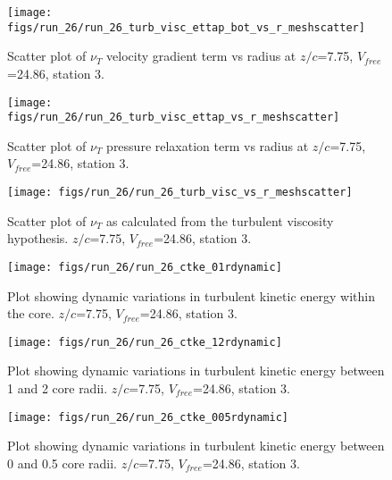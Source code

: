 \begin{figure}[H]
\centering
\texttt{[image: figs/run\_26/run\_26\_turb\_visc\_ettap\_bot\_vs\_r\_meshscatter]}
\caption{Scatter plot of $\nu_T$ velocity gradient term vs radius at $z/c$=7.75, $V_{free}$=24.86, station 3.}
\end{figure}


\begin{figure}[H]
\centering
\texttt{[image: figs/run\_26/run\_26\_turb\_visc\_ettap\_vs\_r\_meshscatter]}
\caption{Scatter plot of $\nu_T$ pressure relaxation term vs radius at $z/c$=7.75, $V_{free}$=24.86, station 3.}
\end{figure}


\begin{figure}[H]
\centering
\texttt{[image: figs/run\_26/run\_26\_turb\_visc\_vs\_r\_meshscatter]}
\caption{Scatter plot of $\nu_T$ as calculated from the turbulent viscosity hypothesis. $z/c$=7.75, $V_{free}$=24.86, station 3.}
\end{figure}


\begin{figure}[H]
\centering
\texttt{[image: figs/run\_26/run\_26\_ctke\_01rdynamic]}
\caption{Plot showing dynamic variations in turbulent kinetic energy within the core. $z/c$=7.75, $V_{free}$=24.86, station 3.}
\end{figure}


\begin{figure}[H]
\centering
\texttt{[image: figs/run\_26/run\_26\_ctke\_12rdynamic]}
\caption{Plot showing dynamic variations in turbulent kinetic energy between 1 and 2 core radii. $z/c$=7.75, $V_{free}$=24.86, station 3.}
\end{figure}


\begin{figure}[H]
\centering
\texttt{[image: figs/run\_26/run\_26\_ctke\_005rdynamic]}
\caption{Plot showing dynamic variations in turbulent kinetic energy between 0 and 0.5 core radii. $z/c$=7.75, $V_{free}$=24.86, station 3.}
\end{figure}



